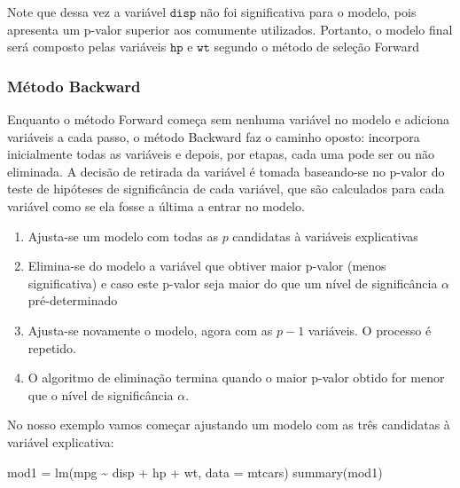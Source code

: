 \documentclass[
]{book}
\newenvironment{Shaded}{\begin{snugshade}}{\end{snugshade}}
\newcommand{\AttributeTok}[1]{\textcolor[rgb]{0.77,0.63,0.00}{#1}}
\newcommand{\FunctionTok}[1]{\textcolor[rgb]{0.00,0.00,0.00}{#1}}
\newcommand{\NormalTok}[1]{#1}
\newcommand{\OtherTok}[1]{\textcolor[rgb]{0.56,0.35,0.01}{#1}}
\newcommand{\SpecialCharTok}[1]{\textcolor[rgb]{0.00,0.00,0.00}{#1}}
\providecommand{\tightlist}{%
  \setlength{\itemsep}{0pt}\setlength{\parskip}{0pt}}
\begin{document}
Note que dessa vez a variável \(\texttt{disp}\) não foi significativa para o modelo, pois apresenta um p-valor superior aos comumente utilizados. Portanto, o modelo final será composto pelas variáveis \(\texttt{hp}\) e \(\texttt{wt}\) segundo o método de seleção Forward

\hypertarget{muxe9todo-backward}{%
\subsubsection{Método Backward}\label{muxe9todo-backward}}

Enquanto o método Forward começa sem nenhuma variável no modelo e adiciona variáveis a cada passo, o método Backward faz o caminho oposto: incorpora inicialmente todas as variáveis e depois, por etapas, cada uma pode ser ou não eliminada. A decisão de retirada da variável é tomada baseando-se no p-valor do teste de hipóteses de significância de cada variável, que são calculados para cada variável como se ela fosse a última a entrar no modelo.

\begin{enumerate}
\def\labelenumi{\arabic{enumi}.}
\tightlist
\item
  Ajusta-se um modelo com todas as \(p\) candidatas à variáveis explicativas
\item
  Elimina-se do modelo a variável que obtiver maior p-valor (menos significativa) e caso este p-valor seja maior do que um nível de significância \(\alpha\) pré-determinado
\item
  Ajusta-se novamente o modelo, agora com as \(p-1\) variáveis. O processo é repetido.
\item
  O algoritmo de eliminação termina quando o maior p-valor obtido for menor que o nível de significância \(\alpha\).
\end{enumerate}

No nosso exemplo vamos começar ajustando um modelo com as três candidatas à variável explicativa:

\begin{Shaded}
\begin{Highlighting}[]
\NormalTok{mod1 }\OtherTok{=} \FunctionTok{lm}\NormalTok{(mpg }\SpecialCharTok{\textasciitilde{}}\NormalTok{ disp }\SpecialCharTok{+}\NormalTok{ hp }\SpecialCharTok{+}\NormalTok{ wt, }\AttributeTok{data =}\NormalTok{ mtcars)}
\FunctionTok{summary}\NormalTok{(mod1)}
\end{Highlighting}
\end{Shaded}
\end{document}

